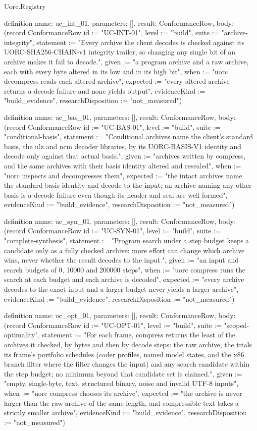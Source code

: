 \begin{lexlean}{Uorc.Registry}
\begin{semanticmodule}
definition{
  name: uc_int_01,
  parameters: [],
  result: ConformanceRow,
  body: (record ConformanceRow {id := "UC-INT-01", level := "build", suite := "archive-integrity", statement := "Every archive the client decodes is checked against its UORC-SHA256-CHAIN-v1 integrity trailer, so changing any single bit of an archive makes it fail to decode.", given := "a program archive and a raw archive, each with every byte altered in its low and in its high bit", when := "uorc decompress reads each altered archive", expected := "every altered archive returns a decode failure and none yields output", evidenceKind := "build_evidence", researchDisposition := "not_measured"})
}

definition{
  name: uc_bas_01,
  parameters: [],
  result: ConformanceRow,
  body: (record ConformanceRow {id := "UC-BAS-01", level := "build", suite := "conditional-basis", statement := "Conditional archives name the client's standard basis, the ulz and ncm decoder libraries, by its UORC-BASIS-V1 identity and decode only against that actual basis.", given := "archives written by compress, and the same archives with their basis identity altered and resealed", when := "uorc inspects and decompresses them", expected := "the intact archives name the standard basis identity and decode to the input; an archive naming any other basis is a decode failure even though its header and seal are well formed", evidenceKind := "build_evidence", researchDisposition := "not_measured"})
}

definition{
  name: uc_syn_01,
  parameters: [],
  result: ConformanceRow,
  body: (record ConformanceRow {id := "UC-SYN-01", level := "build", suite := "complete-synthesis", statement := "Program search under a step budget keeps a candidate only as a fully checked archive: more effort can change which archive wins, never whether the result decodes to the input.", given := "an input and search budgets of 0, 10000 and 200000 steps", when := "uorc compress runs the search at each budget and each archive is decoded", expected := "every archive decodes to the exact input and a larger budget never yields a larger archive", evidenceKind := "build_evidence", researchDisposition := "not_measured"})
}

definition{
  name: uc_opt_01,
  parameters: [],
  result: ConformanceRow,
  body: (record ConformanceRow {id := "UC-OPT-01", level := "build", suite := "scoped-optimality", statement := "For each frame, compress returns the least of the archives it checked, by bytes and then by decode steps: the raw archive, the trials its frame's portfolio schedules (coder profiles, named model states, and the x86 branch filter where the filter changes the input) and any search candidate within the step budget; no minimum beyond that candidate set is claimed.", given := "empty, single-byte, text, structured binary, noise and invalid UTF-8 inputs", when := "uorc compress chooses its archive", expected := "the archive is never larger than the raw archive of the same length, and compressible text takes a strictly smaller archive", evidenceKind := "build_evidence", researchDisposition := "not_measured"})
}


\end{semanticmodule}
\end{lexlean}
